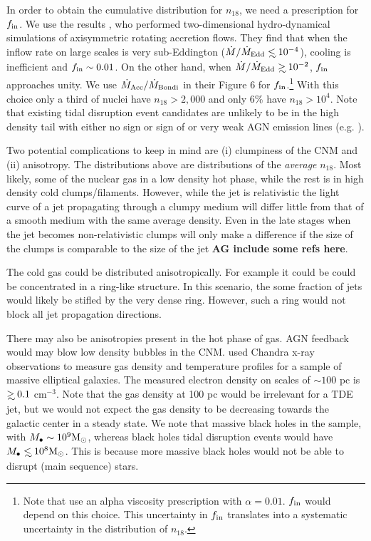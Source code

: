 \documentclass[usenatbib,fleqn]{mnras}
\newcommand\lsim{\mathrel{\rlap{\lower4pt\hbox{\hskip1pt$\sim$}}
    \raise1pt\hbox{$<$}}}
\newcommand\gsim{\mathrel{\rlap{\lower4pt\hbox{\hskip1pt$\sim$}}
    \raise1pt\hbox{$>$}}}
\newcommand{\Mbh}[1][]{M_{\bullet#1}}
\newcommand{\Msun}{{\rm M_\odot}}
\begin{document}
In order to obtain the cumulative distribution for $n_{18}$, we need a
prescription for $f_{\rm in}$. We use the results \citet{Li+2013}, who
performed two-dimensional hydro-dynamical simulations of axisymmetric
rotating accretion flows. They find that when the inflow rate on large
scales is very sub-Eddington ($\dot{M}/\dot{M}_{\rm Edd} \lsim
10^{-4}$), cooling is inefficient and $f_{\rm in}\sim 0.01$. On the
other hand, when $\dot{M}/\dot{M}_{\rm Edd}\gsim 10^{-2}$, $f_{\rm
  in}$ approaches unity.  We use $\dot{M}_{\rm Acc}/\dot{M}_{\rm
  Bondi}$ in their Figure 6 for $f_{\rm in}$.\footnote{Note that
  \citet{Li+2013} use an alpha viscosity prescription with
  $\alpha=0.01$.  $f_{\rm in}$ would depend on this choice. This
  uncertainty in $f_{\rm in}$ translates into a systematic uncertainty
  in the distribution of $n_{18}$.}  With this choice only a third of
nuclei have $n_{18}>2,000$ and only 6\% have $n_{18}>10^{4}$. Note
that existing tidal disruption event candidates are unlikely to be in
the high density tail with either no sign or sign of or very weak AGN
emission lines (e.g. \citealt{van-Velzen+2011, Arcavi+2014}).

Two potential complications to keep in mind are (i) clumpiness of the
CNM and (ii) anisotropy. The distributions above are distributions of
the {\it average} $n_{18}$.  Most likely, some of the nuclear gas in a
low density hot phase, while the rest is in high density cold
clumps/filaments.  However, while the jet is relativistic the
light curve of a jet propagating through a clumpy medium will differ
little from that of a smooth medium with the same average
density. Even in the late stages when the jet becomes non-relativistic
clumps will only make a difference if the size of the clumps is
comparable to the size of the jet {\bf AG include some refs here}.

The cold gas could be distributed anisotropically. For example it could
be could be concentrated in a ring-like structure. In this scenario,
the some fraction of jets would likely be stifled by the very dense
ring. However, such a ring would not block all jet propagation
directions. 

There may also be anisotropies present in the hot phase of gas. AGN
feedback would may blow low density bubbles in the
CNM. \citet{Russell+2013} used Chandra x-ray observations to measure
gas density and temperature profiles for a sample of massive
elliptical galaxies. The measured electron density on scales of $\sim
100$ pc is $\gsim 0.1$ cm$^{-3}$. Note that the gas density at 100 pc
would be irrelevant for a TDE jet, but we would not expect the gas
density to be decreasing towards the galactic center in a steady
state.  We note that massive black holes in the \citet{Russell+2013}
sample, with $\Mbh\sim 10^{9} \Msun$, whereas black holes tidal
disruption events would have $\Mbh\lsim 10^8 \Msun$. This is because
more massive black holes would not be able to disrupt (main sequence)
stars.
\end{document}
